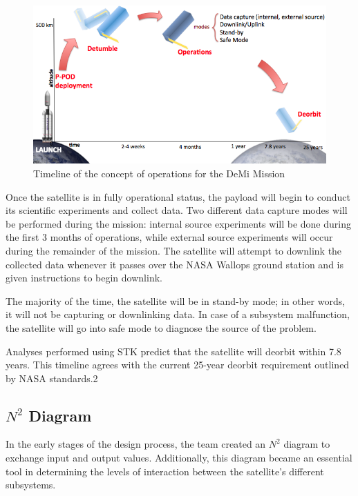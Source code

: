 \documentclass[12pt]{article}
\begin{document}
		\begin{figure}[!ht]
				\centering
				\includegraphics[width=5in]{images/MissionOverview_1.png}
				\caption{Timeline of the concept of operations for the DeMi Mission}
				\label{fig:Mission_ConOps}
			\end{figure}
		
		Once the satellite is in fully operational status, the payload will begin to conduct its scientific experiments and collect data. Two different data capture modes will be performed during the mission: internal source experiments will be done during the first 3 months of operations, while external source experiments will occur during the remainder of the mission. The satellite will attempt to downlink the collected data whenever it passes over the NASA Wallops ground station and is given instructions to begin downlink. 

The majority of the time, the satellite will be in stand-by mode; in other words, it will not be capturing or downlinking data. In case of a subsystem malfunction, the satellite will go into safe mode to diagnose the source of the problem. 

Analyses performed using STK predict that the satellite will deorbit within 7.8 years. This timeline agrees with the current 25-year deorbit requirement outlined by NASA standards.2

		\subsection{$N^2$ Diagram}
		
		In the early stages of the design process, the team created an $N^2$ diagram to exchange input and output values. Additionally, this diagram became an essential tool in determining the levels of interaction between the satellite’s different subsystems. 
		
\end{document}
